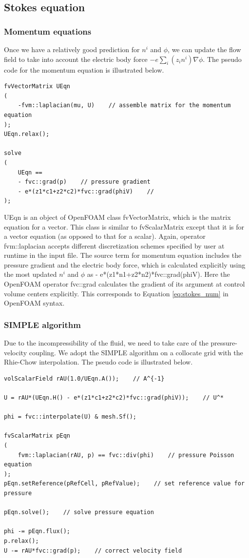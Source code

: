 \subsection{Stokes equation}
\subsubsection{Momentum equations}
Once we have a relatively good prediction for $n^i$ and $\phi$, we can update the flow field to take into account the electric body force $-e\sum_i(z_in^i)\nabla\phi$. The pseudo code for the momentum equation is illustrated below.

\begin{lstlisting}
fvVectorMatrix UEqn
(
    -fvm::laplacian(mu, U)    // assemble matrix for the momentum equation
);
UEqn.relax();

solve
(
    UEqn == 
	- fvc::grad(p)    // pressure gradient 
	- e*(z1*c1+z2*c2)*fvc::grad(phiV)    //
);
\end{lstlisting}

\textsf{UEqn} is an object of OpenFOAM class \textsf{fvVectorMatrix}, which is the matrix equation for a vector. This class is similar to \textsf{fvScalarMatrix} except that it is for a vector equation (as opposed to that for a scalar). Again, operator \textsf{fvm::laplacian} accepts different discretization schemes specified by user at runtime in the input file. The source term for momentum equation includes the pressure gradient and the electric body force, which is calculated explicitly using the most updated $n^i$ and $\phi$ as \textsf{- e*(z1*n1+z2*n2)*fvc::grad(phiV)}. Here the OpenFOAM operator \textsf{fvc::grad} calculates the gradient of its argument at control volume centers explicitly. This corresponds to Equation \ref{eq:stokes_num} in OpenFOAM syntax.

\subsubsection{SIMPLE algorithm}
Due to the incompressibility of the fluid, we need to take care of the pressure-velocity coupling. We adopt the SIMPLE algorithm on a collocate grid with the Rhie-Chow interpolation. The pseudo code is illustrated below.

\begin{lstlisting}
volScalarField rAU(1.0/UEqn.A());    // A^{-1}

U = rAU*(UEqn.H() - e*(z1*c1+z2*c2)*fvc::grad(phiV));    // U^*
    
phi = fvc::interpolate(U) & mesh.Sf();    

fvScalarMatrix pEqn
(
    fvm::laplacian(rAU, p) == fvc::div(phi)    // pressure Poisson equation
);
pEqn.setReference(pRefCell, pRefValue);    // set reference value for pressure

pEqn.solve();    // solve pressure equation

phi -= pEqn.flux();
p.relax();
U -= rAU*fvc::grad(p);    // correct velocity field
\end{lstlisting}

